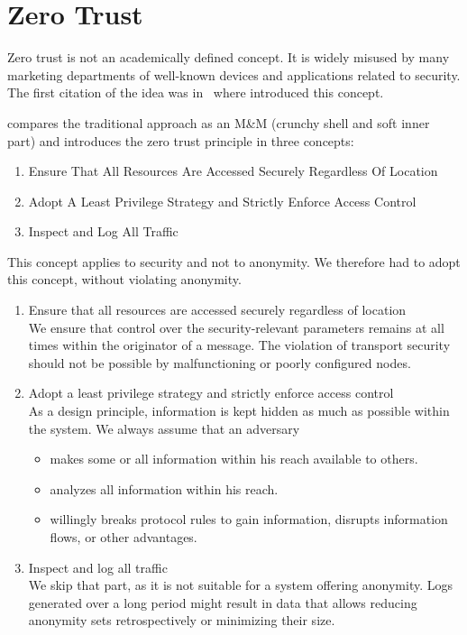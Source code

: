 \section{Zero Trust}\label{sec:zeroTrust}
Zero trust is not an academically defined concept. It is widely misused by many marketing departments of well-known devices and applications related to security. The first citation of the idea was in~\cite{kindervag2010no} where \citeauthor{kindervag2010no} introduced this concept.

\citeauthor{kindervag2010no} compares the traditional approach as an M\&M (crunchy shell and soft inner part) and introduces the zero trust principle in three concepts:
\begin{shadequote}{}
	\begin{enumerate}
		\item Ensure That All Resources Are Accessed Securely Regardless Of Location
		\item Adopt A Least Privilege Strategy and Strictly Enforce Access Control
		\item Inspect and Log All Traffic
	\end{enumerate}
\end{shadequote}

This concept applies to security and not to anonymity. We therefore had to adopt this concept, without violating anonymity.
\begin{enumerate}
	\item Ensure that all resources are accessed securely regardless of location\\
	We ensure that control over the security-relevant parameters remains at all times within the originator of a message. The violation of transport security should not be possible by malfunctioning or poorly configured nodes.
	\item Adopt a least privilege strategy and strictly enforce access control\\
	As a design principle, information is kept hidden as much as possible within the system. We always assume that an adversary
	\begin{itemize}
		\item makes some or all information within his reach available to others.
		\item analyzes all information within his reach.
		\item willingly breaks protocol rules to gain information, disrupts information flows, or other advantages.
	\end{itemize}		
	\item Inspect and log all traffic\\
	We skip that part, as it is not suitable for a system offering anonymity. Logs generated over a long period might result in data that allows reducing anonymity sets retrospectively or minimizing their size.
	
\end{enumerate}

